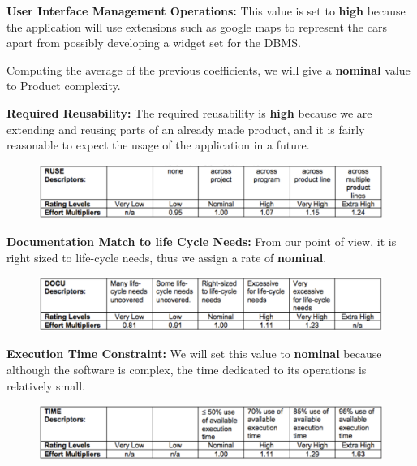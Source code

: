 \documentclass[a4paper,10pt]{article}
\begin{document}
\begin{description}
\begin{description}
    \item[$\bullet$] \textbf{User Interface Management Operations: } This value is set to \textbf{high} because the application will use extensions such as google maps to represent the cars apart from possibly developing a widget set for the DBMS. 
    \item Computing the average of the previous coefficients, we will give a \textbf{nominal} value to Product complexity.  
  \end{description}
\item[$\bullet$] \textbf{Required Reusability:} The required reusability is \textbf{high} because we are extending and reusing parts of an already made product, and it is fairly reasonable to expect the usage of the application in a future. 
          \begin{figure}[!h]
  \centering
    \includegraphics[scale=0.32]{Resources/cocomo/ruse.png}
  \end{figure}\FloatBarrier\item[$\bullet$] \textbf{Documentation Match to life Cycle Needs:} From our point of view, it is right sized to life-cycle needs, thus we assign a rate of \textbf{nominal}.
          \begin{figure}[!h]
  \centering
    \includegraphics[scale=0.32]{Resources/cocomo/docu.png}
  \end{figure}\FloatBarrier
  \item[$\bullet$] \textbf{Execution Time Constraint:} We will set this value to \textbf{nominal} because although the software is complex, the time dedicated to its operations is relatively small.
          \begin{figure}[!h]
  \centering
    \includegraphics[scale=0.32]{Resources/cocomo/time.png}
  \end{figure}\FloatBarrier

\end{description}
\end{document}
